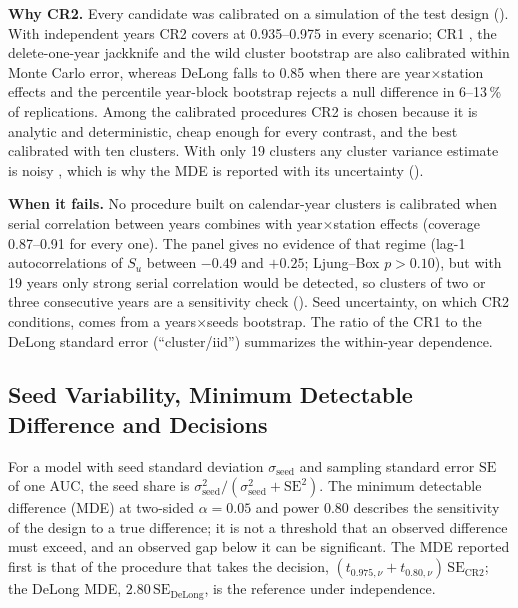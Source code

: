 \documentclass[11pt,a4paper]{article}
\begin{document}
\textbf{Why CR2.} Every candidate was calibrated on a simulation of the test design (). With independent years CR2 covers at 0.935--0.975 in every scenario; CR1 \citep{obuchowski1997}, the delete-one-year jackknife and the wild cluster bootstrap \citep{webb2023} are also calibrated within Monte Carlo error, whereas DeLong falls to 0.85 when there are year$\times$station effects and the percentile year-block bootstrap \citep{field2007} rejects a null difference in 6--13\,\% of replications. Among the calibrated procedures CR2 is chosen because it is analytic and deterministic, cheap enough for every contrast, and the best calibrated with ten clusters. With only 19 clusters any cluster variance estimate is noisy \citep{cameron2008}, which is why the MDE is reported with its uncertainty ().

\textbf{When it fails.} No procedure built on calendar-year clusters is calibrated when serial correlation between years combines with year$\times$station effects (coverage 0.87--0.91 for every one). The panel gives no evidence of that regime (lag-1 autocorrelations of $S_u$ between $-0.49$ and $+0.25$; Ljung--Box $p>0.10$), but with 19 years only strong serial correlation would be detected, so clusters of two or three consecutive years \citep{kunsch1989} are a sensitivity check (). Seed uncertainty, on which CR2 conditions, comes from a years$\times$seeds bootstrap. The ratio of the CR1 to the DeLong standard error (``cluster/iid'') summarizes the within-year dependence.

\subsection{Seed Variability, Minimum Detectable Difference and Decisions}
\label{sec:multiplicity}

For a model with seed standard deviation $\sigma_{\text{seed}}$ and sampling standard error $\text{SE}$ of one AUC, the seed share is $\sigma_{\text{seed}}^2/(\sigma_{\text{seed}}^2+\text{SE}^2)$. The minimum detectable difference (MDE) at two-sided $\alpha=0.05$ and power 0.80 describes the sensitivity of the design to a true difference; it is not a threshold that an observed difference must exceed, and an observed gap below it can be significant. The MDE reported first is that of the procedure that takes the decision, $(t_{0.975,\nu}+t_{0.80,\nu})\,\text{SE}_{\text{CR2}}$; the DeLong MDE, $2.80\,\text{SE}_{\text{DeLong}}$, is the reference under independence.
\end{document}
